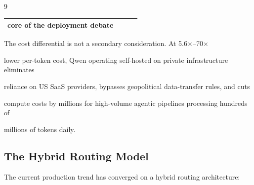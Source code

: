 \documentclass[11pt]{article}
\theoremstyle{definition}
\begin{document}
\begin{thebibliography}{9}
\begin{table}[h]
\begin{tabular}{p{3.8cm}p{2.5cm}p{2.8cm}p{4cm}}
  core of the deployment debate \\





\bottomrule





\end{tabular}





\end{table}











The cost differential is not a secondary consideration. At 5.6$\times$--70$\times$





lower per-token cost, Qwen operating self-hosted on private infrastructure eliminates





reliance on US SaaS providers, bypasses geopolitical data-transfer rules, and cuts





compute costs by millions for high-volume agentic pipelines processing hundreds of





millions of tokens daily.











\subsection{The Hybrid Routing Model}











The current production trend has converged on a hybrid routing architecture:












\end{thebibliography}
\end{document}
